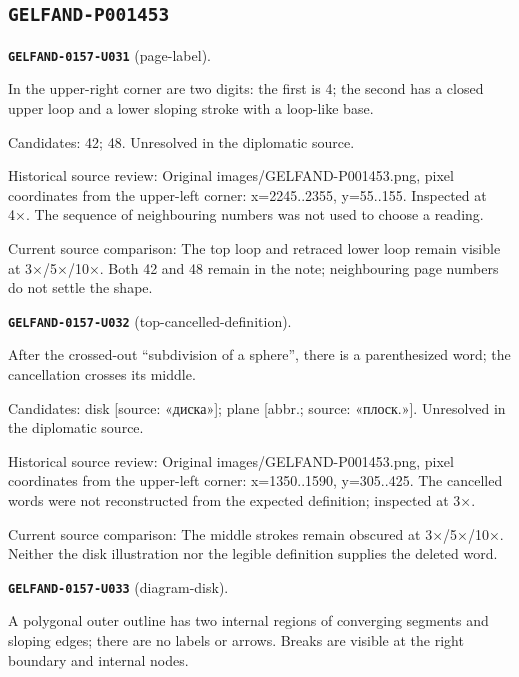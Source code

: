 \subsection*{\texttt{GELFAND-P001453}}
\par\noindent\leavevmode{}\label{GELFAND-0157-U031}\label{GELFAND-P001453:page-label}\textbf{\texttt{GELFAND-0157-U031}} (page-label).\nopagebreak[4]\par
In the upper-right corner are two digits: the first is 4; the second has a closed upper loop and a lower sloping stroke with a loop-like base.\par
Candidates: 42; 48. Unresolved in the diplomatic source.\par
Historical source review: Original images/GELFAND-P001453.png, pixel coordinates from the upper-left corner: x=2245..2355, y=55..155. Inspected at 4×. The sequence of neighbouring numbers was not used to choose a reading.\par
Current source comparison: The top loop and retraced lower loop remain visible at 3×/5×/10×. Both 42 and 48 remain in the note; neighbouring page numbers do not settle the shape.\par\medskip
\par\noindent\leavevmode{}\label{GELFAND-0157-U032}\label{GELFAND-P001453:top-cancelled-definition}\textbf{\texttt{GELFAND-0157-U032}} (top-cancelled-definition).\nopagebreak[4]\par
After the crossed-out “subdivision of a sphere”, there is a parenthesized word; the cancellation crosses its middle.\par
Candidates: disk [source: «диска»]; plane [abbr.; source: «плоск.»]. Unresolved in the diplomatic source.\par
Historical source review: Original images/GELFAND-P001453.png, pixel coordinates from the upper-left corner: x=1350..1590, y=305..425. The cancelled words were not reconstructed from the expected definition; inspected at 3×.\par
Current source comparison: The middle strokes remain obscured at 3×/5×/10×. Neither the disk illustration nor the legible definition supplies the deleted word.\par\medskip
\par\noindent\leavevmode{}\label{GELFAND-0157-U033}\label{GELFAND-P001453:diagram-disk}\textbf{\texttt{GELFAND-0157-U033}} (diagram-disk).\nopagebreak[4]\par
A polygonal outer outline has two internal regions of converging segments and sloping edges; there are no labels or arrows. Breaks are visible at the right boundary and internal nodes.\par
